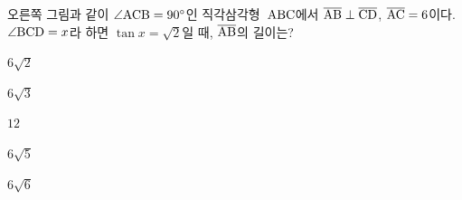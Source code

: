 \noindent\begin{minipage}[t]{0.58\linewidth}\vspace{0pt}\raggedright 오른쪽 그림과 같이 $\angle\mathrm{ACB}=90^\circ$인 직각삼각형~$\mathrm{ABC}$에서 $\overline{\mathrm{AB}}\perp\overline{\mathrm{CD}}$, $\overline{\mathrm{AC}}=6$이다. $\angle\mathrm{BCD}=x$라 하면 $\tan x=\sqrt{2}$일 때, $\overline{\mathrm{AB}}$의 길이는?\end{minipage}\hfill\begin{minipage}[t]{0.4\linewidth}\vspace{0pt}\centering \resizebox{\ifdim\width>\linewidth\linewidth\else\width\fi}{!}{}\end{minipage}\par
\begin{choices32}{\rule[-3ex]{0pt}{8ex}$6\sqrt{2}$}{\rule[-3ex]{0pt}{8ex}$6\sqrt{3}$}{\rule[-3ex]{0pt}{8ex}$12$}{\rule[-3ex]{0pt}{8ex}$6\sqrt{5}$}{\rule[-3ex]{0pt}{8ex}$6\sqrt{6}$}\end{choices32}
